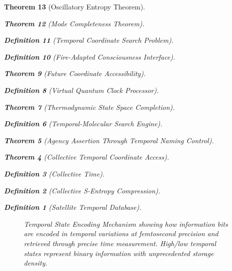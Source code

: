 \documentclass[12pt,a4paper]{article}
\newtheorem{theorem}{Theorem}[section]
\newtheorem{definition}[theorem]{Definition}
\begin{document}
\begin{theorem}[Oscillatory Entropy Theorem]
\begin{theorem}[Mode Completeness Theorem]
\begin{enumerate}
\begin{definition}[Temporal Coordinate Search Problem]
\begin{algorithm}
\begin{definition}[Fire-Adapted Consciousness Interface]
\begin{theorem}[Future Coordinate Accessibility]
\begin{definition}[Virtual Quantum Clock Processor]
\begin{itemize}
\begin{itemize}
\begin{theorem}[Thermodynamic State Space Completion]
\begin{definition}[Temporal-Molecular Search Engine]
\begin{theorem}[Agency Assertion Through Temporal Naming Control]
\begin{remark}
\begin{theorem}[Collective Temporal Coordinate Access]
\begin{definition}[Collective Time]
\begin{definition}[Collective S-Entropy Compression]
\begin{definition}[Satellite Temporal Database]
\begin{algorithm}
\begin{table}[h]
{{\begin{figure}[H]
\caption{Temporal State Encoding Mechanism showing how information bits are encoded in temporal variations at femtosecond precision and retrieved through precise time measurement. High/low temporal states represent binary information with unprecedented storage density.}
\label{fig:temporal_state_encoding}
\end{figure}

}}
\end{table}
\end{algorithm}
\end{definition}
\end{definition}
\end{definition}
\end{theorem}
\end{remark}
\end{theorem}
\end{definition}
\end{theorem}
\end{itemize}
\end{itemize}
\end{definition}
\end{theorem}
\end{definition}
\end{algorithm}
\end{definition}
\end{enumerate}
\end{theorem}
\end{theorem}
\end{document}
